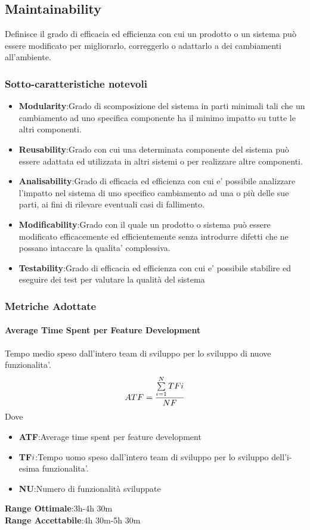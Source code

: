 \subsection{Maintainability}
Definisce il grado di efficacia ed efficienza con cui un prodotto o un sistema può essere modificato per migliorarlo, correggerlo o adattarlo a dei cambiamenti all'ambiente. 
\subsubsection{Sotto-caratteristiche notevoli}
\begin{itemize}
	\item{\textbf{Modularity}}:Grado di scomposizione del sistema in parti minimali tali che un cambiamento ad uno specifica componente ha il minimo impatto su tutte le altri componenti.
	\item{\textbf{Reusability}}:Grado con cui una determinata componente del sistema può essere adattata ed utilizzata in altri sistemi o per realizzare altre componenti.
	\item{\textbf{Analisability}}:Grado di efficacia ed efficienza con cui e' possibile analizzare l'impatto nel sistema di uno specifico cambiamento ad una o più delle sue parti, ai fini di rilevare eventuali casi di fallimento.
	\item{\textbf{Modificability}}:Grado con il quale un prodotto o sistema può essere modificato efficacemente ed efficientemente senza introdurre difetti che ne possano intaccare la qualita' complessiva.
	\item{\textbf{Testability}}:Grado di efficacia ed efficienza con cui e' possibile stabilire ed eseguire dei test per valutare la qualità del sistema
\end{itemize}
\subsubsection{Metriche Adottate}
\paragraph{Average Time Spent per Feature Development}
\begin{flushleft}
Tempo medio speso dall'intero team di sviluppo per lo sviluppo di nuove funzionalita'.
	$$ATF=\frac{\sum\limits_{i=1}^N TF{\small{i}}}{NF}$$
Dove
\begin{itemize}
	\item{\textbf{ATF}}:Average time spent per feature development
	\item{\textbf{TF${\small{i}}$}}:Tempo uomo speso dall'intero team di sviluppo per lo sviluppo dell'i-esima funzionalita'.
	\item{\textbf{NU}}:Numero di funzionalità sviluppate
\end{itemize}
\textbf{Range Ottimale}:3h-4h 30m \\
\textbf{Range Accettabile}:4h 30m-5h 30m
\end{flushleft}
